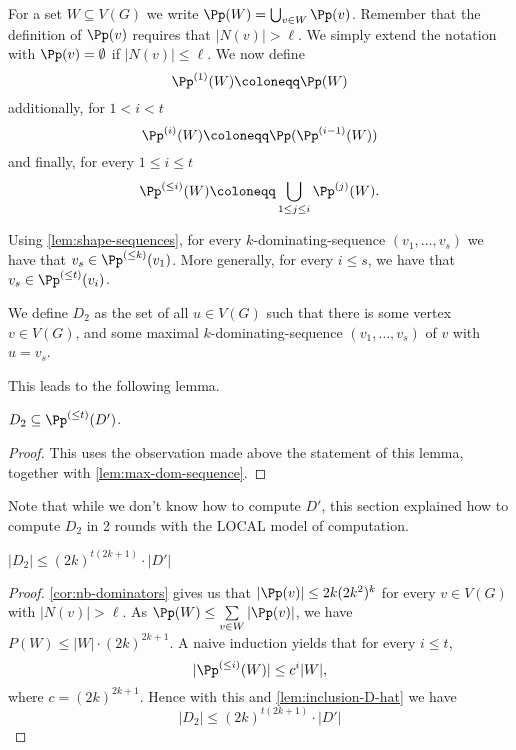 For a set $W\subseteq V(G)$ we write $\Pp(W) = \bigcup_{v\in W}\Pp(v)$.
Remember that the definition of $\Pp(v)$ requires that $|N(v)|>\ell$. We simply
extend the notation with $\Pp(v)=\emptyset$ if $|N(v)|\le \ell$.
We now define
\[\Pp^{(1)}(W)\coloneqq \Pp(W)\]
additionally, for $1<i <t$
\[\Pp^{(i)}(W)\coloneqq \Pp(\Pp^{(i-1)}(W))\]
and finally, for every $1\le i \le t$
\[\Pp^{(\leq i)}(W)\coloneqq \bigcup_{1\leq j\leq i}\Pp^{(j)}(W).\]





Using \cref{lem:shape-sequences}, for every
$k$-dominating-sequence $(v_1,\ldots,v_s)$ we have that
$v_s \in \Pp^{(\le k)}(v_1)$.
More generally, for every $i\le s$, we have that $v_s\in \Pp^{(\le t)}(v_i)$.


\begin{tcolorbox}
We define $D_2$ as the set of all $u\in V(G)$ such that there is some vertex
$v\in V(G)$, and some maximal $k$-dominating-sequence $(v_1,\ldots,v_s)$ of $v$
with $u=v_s$.
\end{tcolorbox}


This leads to the following lemma.
\begin{lemma}\label{lem:inclusion-D-hat}
  $D_2 \subseteq \Pp^{(\le t)}(D')$.
\end{lemma}
\begin{proof}
  This uses the observation made above the statement of this lemma, together
  with \cref{lem:max-dom-sequence}.
\end{proof}
Note that while we don't know how to compute $D'$, this section explained how
to compute $D_2$ in 2 rounds with the LOCAL model of computation.

\begin{lemma}\label{lem:small-D-hat}
  $|D_2| \le (2k)^{t(2k+1)} \cdot|D'|$
\end{lemma}
\begin{proof}
  \cref{cor:nb-dominators} gives us that $|\Pp(v)|\le 2k(2k^2)^k$ for every
  $v\in V(G)$ with $|N(v)|> \ell$.
  As $\Pp(W) \le \sum\limits_{v\in W} |\Pp(v)|$,
  we have $P(W)\le |W|\cdot (2k)^{2k+1}$.
  A naive induction yields that for every $i\le t$,
  \[ |\Pp^{(\le i)}(W)|\leq c^i|W|, \] where $c=(2k)^{2k+1}$.
  Hence with this and \cref{lem:inclusion-D-hat} we have
  \[|D_2| \le (2k)^{t(2k+1)} \cdot|D'|\]
\end{proof}
